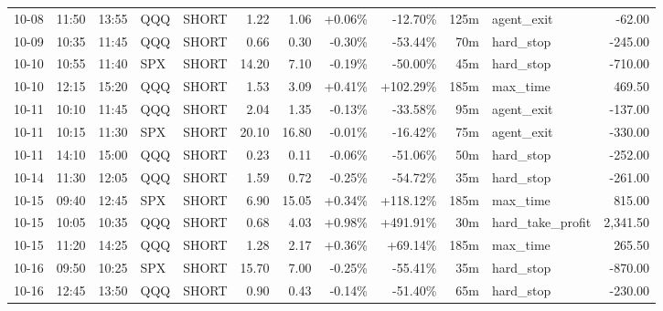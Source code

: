 \documentclass[11pt,a4paper,twoside]{article}
\begin{document}
\begin{center}
\begin{longtable}{>{\color{txtmain}}l l l l l r r r r r >{\color{txtmain}}l r}
10-08 & 11:50 & 13:55 & QQQ & SHORT & 1.22 & 1.06 & \textcolor{wingreen}{+0.06\%} & \textcolor{lossred}{-12.70\%} & 125m & agent\_exit & \textcolor{lossred}{-62.00} \\
10-09 & 10:35 & 11:45 & QQQ & SHORT & 0.66 & 0.30 & \textcolor{lossred}{-0.30\%} & \textcolor{lossred}{-53.44\%} & 70m & hard\_stop & \textcolor{lossred}{-245.00} \\
10-10 & 10:55 & 11:40 & SPX & SHORT & 14.20 & 7.10 & \textcolor{lossred}{-0.19\%} & \textcolor{lossred}{-50.00\%} & 45m & hard\_stop & \textcolor{lossred}{-710.00} \\
10-10 & 12:15 & 15:20 & QQQ & SHORT & 1.53 & 3.09 & \textcolor{wingreen}{+0.41\%} & \textcolor{wingreen}{+102.29\%} & 185m & max\_time & \textcolor{wingreen}{469.50} \\
10-11 & 10:10 & 11:45 & QQQ & SHORT & 2.04 & 1.35 & \textcolor{lossred}{-0.13\%} & \textcolor{lossred}{-33.58\%} & 95m & agent\_exit & \textcolor{lossred}{-137.00} \\
10-11 & 10:15 & 11:30 & SPX & SHORT & 20.10 & 16.80 & \textcolor{lossred}{-0.01\%} & \textcolor{lossred}{-16.42\%} & 75m & agent\_exit & \textcolor{lossred}{-330.00} \\
10-11 & 14:10 & 15:00 & QQQ & SHORT & 0.23 & 0.11 & \textcolor{lossred}{-0.06\%} & \textcolor{lossred}{-51.06\%} & 50m & hard\_stop & \textcolor{lossred}{-252.00} \\
10-14 & 11:30 & 12:05 & QQQ & SHORT & 1.59 & 0.72 & \textcolor{lossred}{-0.25\%} & \textcolor{lossred}{-54.72\%} & 35m & hard\_stop & \textcolor{lossred}{-261.00} \\
10-15 & 09:40 & 12:45 & SPX & SHORT & 6.90 & 15.05 & \textcolor{wingreen}{+0.34\%} & \textcolor{wingreen}{+118.12\%} & 185m & max\_time & \textcolor{wingreen}{815.00} \\
10-15 & 10:05 & 10:35 & QQQ & SHORT & 0.68 & 4.03 & \textcolor{wingreen}{+0.98\%} & \textcolor{wingreen}{+491.91\%} & 30m & hard\_take\_profit & \textcolor{wingreen}{2,341.50} \\
10-15 & 11:20 & 14:25 & QQQ & SHORT & 1.28 & 2.17 & \textcolor{wingreen}{+0.36\%} & \textcolor{wingreen}{+69.14\%} & 185m & max\_time & \textcolor{wingreen}{265.50} \\
10-16 & 09:50 & 10:25 & SPX & SHORT & 15.70 & 7.00 & \textcolor{lossred}{-0.25\%} & \textcolor{lossred}{-55.41\%} & 35m & hard\_stop & \textcolor{lossred}{-870.00} \\
10-16 & 12:45 & 13:50 & QQQ & SHORT & 0.90 & 0.43 & \textcolor{lossred}{-0.14\%} & \textcolor{lossred}{-51.40\%} & 65m & hard\_stop & \textcolor{lossred}{-230.00} \\

\end{longtable}
\end{center}
\end{document}
